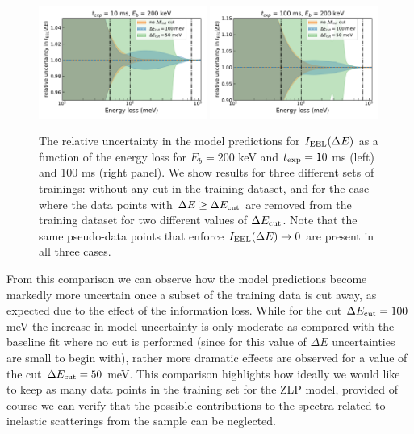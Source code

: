 \begin{figure}[t]
    \centering
    \includegraphics[width=0.49\textwidth]{plots/prediction_with_cut_10ms.pdf}
    \includegraphics[width=0.49\textwidth]{plots/prediction_with_cut_100ms.pdf}
    \caption{\small The relative uncertainty in the model predictions for $I_{\rm EEL}(\Delta E)$
      as a function of the energy loss for $E_b=200$ keV and $t_{\rm exp}=10$ ms (left)
      and 100 ms (right panel).
      We show results for three different sets of trainings: without any cut
      in the training dataset, and for the case where the data points with $\Delta E \ge \Delta E_{\rm cut}$
      are removed from the training dataset for two different values
      of $\Delta E_{\rm cut}$.
      Note that the same pseudo-data points that enforce $I_{\rm EEL}(\Delta E)\to 0$ are present
      in all three cases.
      \label{fig:EELS_vacuum_DeltaE}}
\end{figure}

From this comparison we can observe how the model predictions become markedly more uncertain
once a subset of the training data is cut away, as expected due to the effect of the information
loss.
%
While for the cut $\Delta E_{\rm cut}=100$ meV the increase in model uncertainty is only moderate
as compared with the baseline fit where no cut is performed (since for this value of $\Delta E$
uncertainties are small to begin with), rather more dramatic effects are observed
for a value of the cut $\Delta E_{\rm cut}=50$ meV.
%
This comparison highlights how ideally we would like to keep as many data points
in the training set for the ZLP model, provided of course we can verify that the
possible contributions to the spectra related to inelastic scatterings from the
sample can be neglected.

